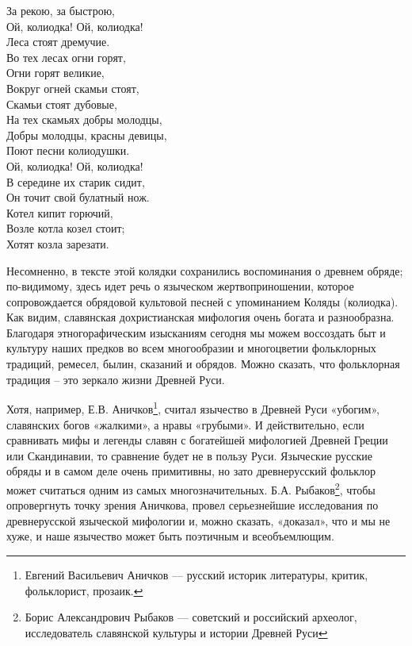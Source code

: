\documentclass[a4paper, 12pt]{report}
\begin{document}
\begin{center}
	За рекою, за быстрою, \\
	Ой, колиодка! Ой, колиодка!\\
	Леса стоят дремучие.\\
	Во тех лесах огни горят,\\
	Огни горят великие,\\
	Вокруг огней скамьи стоят,\\
	Скамьи стоят дубовые,\\
	На тех скамьях добры молодцы,\\
	Добры молодцы, красны девицы,\\
	Поют песни колиодушки.\\
	Ой, колиодка! Ой, колиодка!\\
	В середине их старик сидит,\\
	Он точит свой булатный нож.\\
	Котел кипит горючий,\\
	Возле котла козел стоит;\\
	Хотят козла зарезати.\\
\end{center}

Несомненно, в тексте этой колядки сохранились воспоминания о древнем обряде; по-видимому, здесь идет речь о языческом жертвоприношении, которое сопровождается обрядовой культовой песней с упоминанием Коляды (колиодка).
Как видим, славянская дохристианская мифология очень богата и разнообразна. Благодаря этногорафическим изысканиям сегодня мы можем воссоздать быт и культуру наших предков во всем многообразии и многоцветии фольклорных традиций, ремесел, былин, сказаний и обрядов. Можно сказать, что фольклорная традиция – это зеркало жизни Древней Руси.

Хотя, например, Е.В. Аничков\footnote{Евгений Васильевич Аничков — русский историк литературы, критик, фольклорист, прозаик.}, считал язычество в Древней Руси «убогим», славянских богов «жалкими», а нравы «грубыми». И действительно, если сравнивать мифы и легенды славян с богатейшей мифологией Древней Греции или Скандинавии, то сравнение будет не в пользу Руси. Языческие русские обряды и в самом деле очень примитивны, но зато древнерусский фольклор может считаться одним из самых многозначительных. Б.А. Рыбаков\footnote{Борис Александрович Рыбаков — советский и российский археолог, исследователь славянской культуры и истории Древней Руси}, чтобы опровергнуть точку зрения Аничкова, провел серьезнейшие исследования по древнерусской языческой мифологии и, можно сказать, «доказал», что и мы не хуже, и наше язычество может быть поэтичным и всеобъемлющим.
\end{document}
